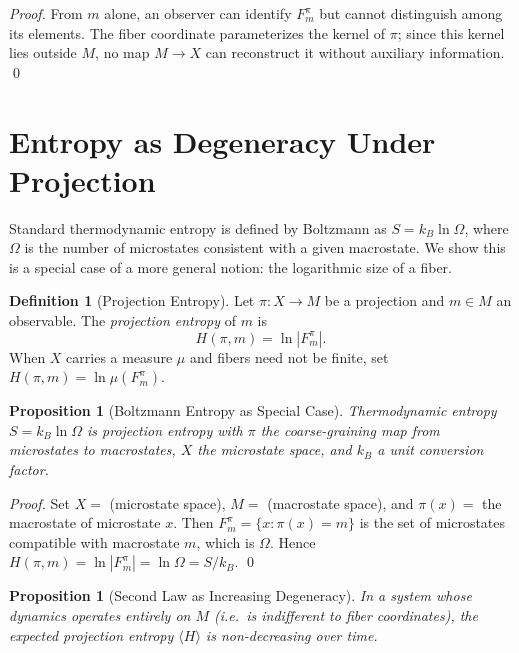 \documentclass[12pt, a4paper, twoside]{article}
\theoremstyle{plain}
\newtheorem{proposition}[theorem]{Proposition}
\theoremstyle{definition}
\newtheorem{definition}[theorem]{Definition}
\theoremstyle{remark}
\newcommand{\Proj}{\pi}
\newcommand{\Fibover}[2]{F^{#1}_{#2}}
\newcommand{\Ent}{H}
\begin{document}
\begin{proof}
From $m$ alone, an observer can identify $\Fibover{\Proj}{m}$ but cannot
distinguish among its elements. The fiber coordinate parameterizes the kernel
of $\Proj$; since this kernel lies outside $M$, no map $M \to X$ can
reconstruct it without auxiliary information.
\qed
\end{proof}

\section{Entropy as Degeneracy Under Projection}
\label{sec:entropy}

Standard thermodynamic entropy is defined by Boltzmann as
$S = k_B \ln \Omega$, where $\Omega$ is the number of microstates consistent
with a given macrostate. We show this is a special case of a more general
notion: the logarithmic size of a fiber.

\begin{definition}[Projection Entropy]
Let $\Proj: X \to M$ be a projection and $m \in M$ an observable. The
\emph{projection entropy} of $m$ is
\[
  \Ent(\Proj, m) = \ln |\Fibover{\Proj}{m}|.
\]
When $X$ carries a measure $\mu$ and fibers need not be finite, set
$\Ent(\Proj, m) = \ln \mu(\Fibover{\Proj}{m})$.
\end{definition}

\begin{proposition}[Boltzmann Entropy as Special Case]
\label{prop:boltzmann}
Thermodynamic entropy $S = k_B \ln \Omega$ is projection entropy with $\Proj$
the coarse-graining map from microstates to macrostates, $X$ the microstate
space, and $k_B$ a unit conversion factor.
\end{proposition}

\begin{proof}
Set $X = $ (microstate space), $M = $ (macrostate space), and $\Proj(x) = $
the macrostate of microstate $x$. Then $\Fibover{\Proj}{m} = \{x : \Proj(x) = m\}$
is the set of microstates compatible with macrostate $m$, which is $\Omega$.
Hence $\Ent(\Proj, m) = \ln |\Fibover{\Proj}{m}| = \ln \Omega = S/k_B$.
\qed
\end{proof}

\begin{proposition}[Second Law as Increasing Degeneracy]
\label{prop:second_law}
In a system whose dynamics operates entirely on $M$ (i.e.\ is indifferent to
fiber coordinates), the expected projection entropy $\langle \Ent \rangle$ is
non-decreasing over time.
\end{proposition}
\end{document}
